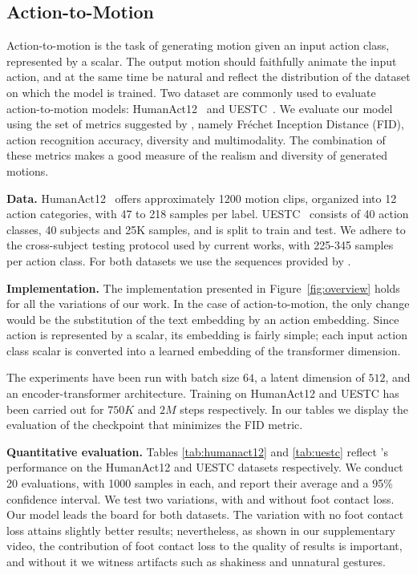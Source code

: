 \subsection{Action-to-Motion}
\vspace{-5pt}

\label{sec:a2m}
Action-to-motion is the task of generating motion given an input action class, represented by a scalar. The output motion should faithfully animate the input action, and at the same time be natural and reflect the distribution of the dataset on which the model is trained. Two dataset are commonly used to evaluate action-to-motion models: HumanAct12~\citep{guo2020action2motion} and UESTC~\citep{ji2018large}. We evaluate our model using the set of metrics suggested by \citet{guo2020action2motion}, namely Fr\'{e}chet Inception Distance (FID), action recognition accuracy, diversity and multimodality. The combination of these metrics makes a good measure of the realism and diversity of generated motions.

\textbf{Data.}
HumanAct12~\citep{guo2020action2motion} offers approximately 1200 motion clips, organized into 12 action categories, with 47 to 218 samples per label. 
UESTC~\citep{ji2018large} consists of 40 action classes, 40 subjects and 25K samples, and is split to train and test. 
We adhere to the cross-subject testing protocol used by current works, with 225-345 samples per action class.
For both datasets we use the sequences provided by \citet{petrovich21actor}.

\textbf{Implementation.}
The implementation presented in Figure~\ref{fig:overview} holds for all the variations of our work. In the case of action-to-motion, the only change would be the substitution of the text embedding by an action embedding. Since action is represented by a scalar, its embedding is fairly simple; each input action class scalar is converted into a learned embedding of the transformer dimension.

The experiments have been run with batch size $64$, a latent dimension of $512$, and an encoder-transformer architecture. Training on HumanAct12 and UESTC has been carried out for $750K$ and $2M$ steps respectively. In our tables we display the evaluation of the checkpoint that minimizes the FID metric. 

\textbf{Quantitative evaluation.}
Tables \ref{tab:humanact12} and \ref{tab:uestc} reflect \ourmethod{}'s performance on the HumanAct12 and UESTC datasets respectively. We conduct 20 evaluations, with 1000 samples in each, and report their average and a 95\% confidence interval.
We test two variations, with and without foot contact loss.
Our model leads the board for both datasets. 
The variation with no foot contact loss attains slightly better results; nevertheless, as shown in our supplementary video, the contribution of foot contact loss to the quality of results is important, and without it we witness artifacts such as shakiness and unnatural gestures. 



